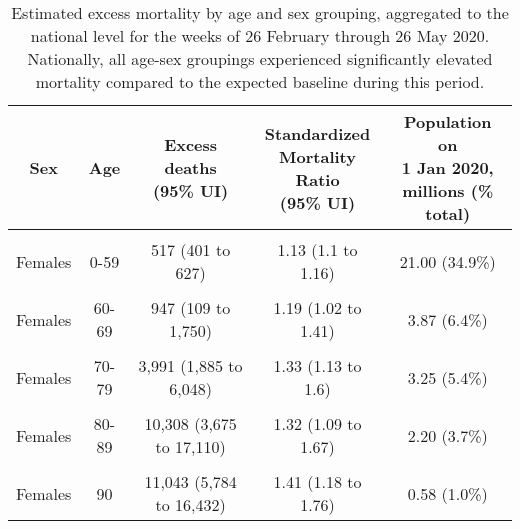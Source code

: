 \documentclass[
]{article}
\begin{document}
\begin{table}[!h]

\caption{\label{tab:excess-demographics}Estimated excess mortality by age and sex grouping, aggregated to the national level for the weeks of 26 February through 26 May 2020. Nationally, all age-sex groupings experienced significantly elevated mortality compared to the expected baseline during this period.}
\centering
\begin{tabular}[t]{ccccc}
\toprule
Sex & Age & \makecell[c]{Excess deaths\\(95\% UI)} & \makecell[c]{Standardized\\Mortality Ratio\\(95\% UI)} & \makecell[c]{Population on\\1 Jan 2020,\\millions (\% total)}\\
\midrule
\cellcolor{gray!6}{Males} & \cellcolor{gray!6}{0-59} & \cellcolor{gray!6}{1,081 (918 to 1,240)} & \cellcolor{gray!6}{1.16 (1.13 to 1.19)} & \cellcolor{gray!6}{21.37 (35.5\%)}\\
Females & 0-59 & 517 (401 to 627) & 1.13 (1.1 to 1.16) & 21.00 (34.9\%)\\
\cellcolor{gray!6}{Males} & \cellcolor{gray!6}{60-69} & \cellcolor{gray!6}{2,600 (1,152 to 3,990)} & \cellcolor{gray!6}{1.29 (1.11 to 1.52)} & \cellcolor{gray!6}{3.55 (5.9\%)}\\
Females & 60-69 & 947 (109 to 1,750) & 1.19 (1.02 to 1.41) & 3.87 (6.4\%)\\
\cellcolor{gray!6}{Males} & \cellcolor{gray!6}{70-79} & \cellcolor{gray!6}{7,703 (4,639 to 10,730)} & \cellcolor{gray!6}{1.42 (1.22 to 1.71)} & \cellcolor{gray!6}{2.75 (4.6\%)}\\
\addlinespace
Females & 70-79 & 3,991 (1,885 to 6,048) & 1.33 (1.13 to 1.6) & 3.25 (5.4\%)\\
\cellcolor{gray!6}{Males} & \cellcolor{gray!6}{80-89} & \cellcolor{gray!6}{10,649 (4,574 to 16,946)} & \cellcolor{gray!6}{1.36 (1.13 to 1.72)} & \cellcolor{gray!6}{1.45 (2.4\%)}\\
Females & 80-89 & 10,308 (3,675 to 17,110) & 1.32 (1.09 to 1.67) & 2.20 (3.7\%)\\
\cellcolor{gray!6}{Males} & \cellcolor{gray!6}{90} & \cellcolor{gray!6}{4,405 (1,979 to 6,879)} & \cellcolor{gray!6}{1.36 (1.14 to 1.71)} & \cellcolor{gray!6}{0.22 (0.4\%)}\\
Females & 90 & 11,043 (5,784 to 16,432) & 1.41 (1.18 to 1.76) & 0.58 (1.0\%)\\
\bottomrule
\end{tabular}
\end{table}
\end{document}
